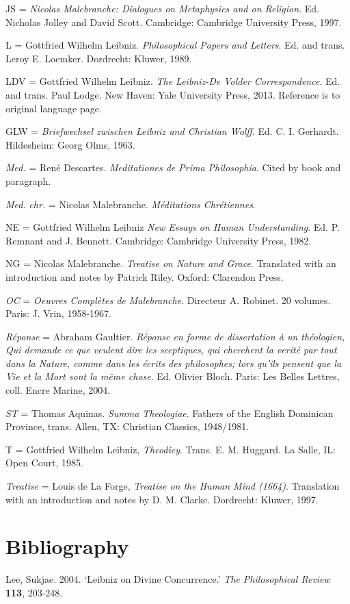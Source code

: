 \documentclass{article}
\begin{document}
JS = \emph{Nicolas Malebranche: Dialogues on Metaphysics and on
Religion}. Ed. Nicholas Jolley and David Scott. Cambridge: Cambridge
University Press, 1997.

L = Gottfried Wilhelm Leibniz. \emph{Philosophical Papers and Letters}.
Ed. and trans. Leroy E. Loemker. Dordrecht: Kluwer, 1989.

LDV = Gottfried Wilhelm Leibniz. \emph{The Leibniz-De Volder
Correspondence}. Ed. and trans. Paul Lodge. New Haven: Yale University
Press, 2013. Reference is to original language page.

GLW = \emph{Briefwechsel zwischen Leibniz und Christian Wolff}. Ed. C.
I. Gerhardt. Hildesheim: Georg Olms, 1963.

\emph{Med.} = René Descartes. \emph{Meditationes de Prima Philosophia}.
Cited by book and paragraph.

\emph{Med.} \emph{chr.} = Nicolas Malebranche. \emph{Méditations
Chrétiennes}.

NE = Gottfried Wilhelm Leibniz \emph{New Essays on Human Understanding}.
Ed. P. Remnant and J. Bennett. Cambridge: Cambridge University Press,
1982.

NG = Nicolas Malebranche. \emph{Treatise on Nature and Grace}.
Translated with an introduction and notes by Patrick Riley. Oxford:
Clarendon Press.

\emph{OC} = \emph{Oeuvres Complètes de Malebranche}. Directeur A.
Robinet. 20 volumes. Paris: J. Vrin, 1958-1967.

\emph{Réponse} = Abraham Gaultier. \emph{Réponse en forme de
dissertation à un théologien, Qui demande ce que veulent dire les
sceptiques, qui cherchent la verité par tout dans la Nature, comme dans
les écrits des philosophes; lors qu'ils pensent que la Vie et la Mort
sont la même chose}. Ed. Olivier Bloch. Paris: Les Belles Lettres, coll.
Encre Marine, 2004.

\emph{ST} = Thomas Aquinas. \emph{Summa Theologiae}. Fathers of the
English Dominican Province, trans. Allen, TX: Christian Classics,
1948/1981.

T = Gottfried Wilhelm Leibniz, \emph{Theodicy}. Trans. E. M. Huggard. La
Salle, IL: Open Court, 1985.

\emph{Treatise} = Louis de La Forge, \emph{Treatise on the Human Mind
(1664)}. Translation with an introduction and notes by D. M. Clarke.
Dordrecht: Kluwer, 1997.

\section{Bibliography}
Lee, Sukjae. 2004. `Leibniz on Divine Concurrence.' \emph{The
Philosophical Review} \textbf{113}, 203-248.
\end{document}
